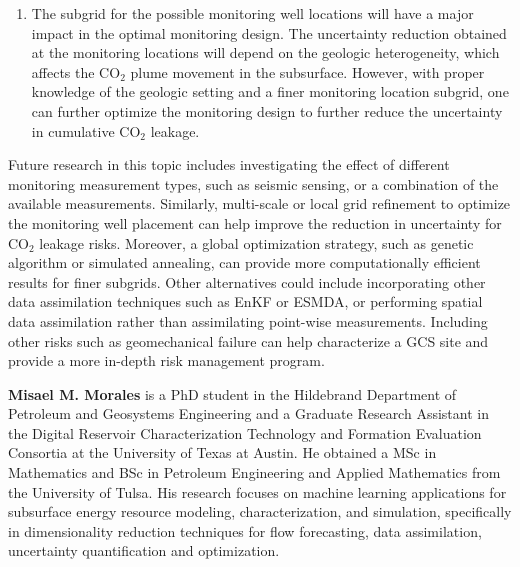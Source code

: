 \documentclass[a4paper,fleqn]{cas-sc}
\begin{document}
\begin{enumerate}
    \item The subgrid for the possible monitoring well locations will have a major impact in the optimal monitoring design. The uncertainty reduction obtained at the monitoring locations will depend on the geologic heterogeneity, which affects the CO$_2$ plume movement in the subsurface. However, with proper knowledge of the geologic setting and a finer monitoring location subgrid, one can further optimize the monitoring design to further reduce the uncertainty in cumulative CO$_2$ leakage.
\end{enumerate}

Future research in this topic includes investigating the effect of different monitoring measurement types, such as seismic sensing, or a combination of the available measurements. Similarly, multi-scale or local grid refinement to optimize the monitoring well placement can help improve the reduction in uncertainty for CO$_2$ leakage risks. Moreover, a global optimization strategy, such as genetic algorithm or simulated annealing, can provide more computationally efficient results for finer subgrids. Other alternatives could include incorporating other data assimilation techniques such as EnKF or ESMDA, or performing spatial data assimilation rather than assimilating point-wise measurements. Including other risks such as geomechanical failure can help characterize a GCS site and provide a more in-depth risk management program. 


\printcredits




\bio{}
{\bf Misael M. Morales} is a PhD student in the Hildebrand Department of Petroleum and Geosystems Engineering and a Graduate Research Assistant in the Digital Reservoir Characterization Technology and Formation Evaluation Consortia at the University of Texas at Austin. He obtained a MSc in Mathematics and BSc in Petroleum Engineering and Applied Mathematics from the University of Tulsa. His research focuses on machine learning applications for subsurface energy resource modeling, characterization, and simulation, specifically in dimensionality reduction techniques for flow forecasting, data assimilation, uncertainty quantification and optimization. 
\endbio
\end{document}
